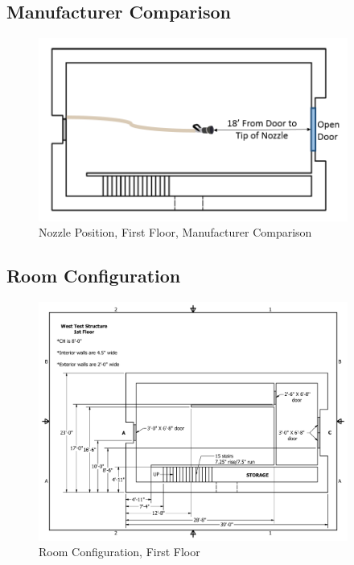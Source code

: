 \documentclass{article}
\begin{document}
\subsection{Manufacturer Comparison}

\begin{figure}[!ht]
	\centering
	\includegraphics[width=4in]{Figures/Air_Entrainment/Measurement_Locations_Firstfloor.png}
	\caption{Nozzle Position, First Floor, Manufacturer Comparison}
	\label{fig:Nozzle_Position_First_Floor_Manufacturer_Comparison}
\end{figure}

\subsection{Room Configuration}

\begin{figure}[!ht]
	\centering
	\includegraphics[width=4in]{Figures/Air_Entrainment/West_Test_Structure_1st_Floor.pdf}
	\caption{Room Configuration, First Floor}
	\label{fig:Room Configuration, First Floor}
\end{figure}
\end{document}
